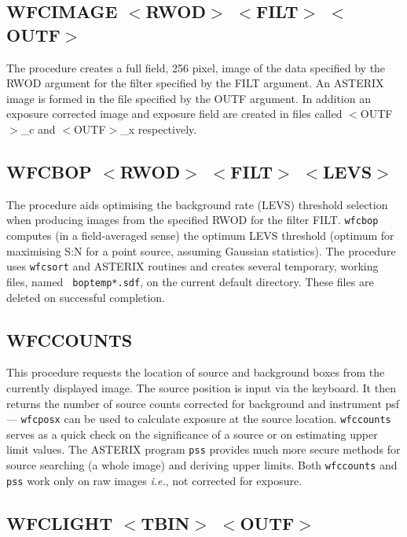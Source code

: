 \subsection{WFCIMAGE $<$RWOD$>$ $<$FILT$>$ $<$OUTF$>$}
\label{sec:procedures:wfcimage}

The procedure creates a full field, 256 pixel, image of the
data specified by the RWOD argument for the filter specified by the
FILT argument. An ASTERIX image is formed in the file specified
by the OUTF argument. In addition an exposure corrected image
and exposure field are created in files called $<$OUTF$>$\_c
and $<$OUTF$>$\_x respectively.

\subsection{WFCBOP $<$RWOD$>$ $<$FILT$>$ $<$LEVS$>$}
\label{sec:procedures:wfcbop}

The procedure aids optimising the background rate (LEVS) threshold
selection when producing images from the specified RWOD for the filter
FILT. {\tt wfcbop} computes (in a field-averaged sense) the optimum
LEVS threshold (optimum for maximising S:N for a point source, assuming
Gaussian statistics).  The procedure uses {\tt wfcsort} and ASTERIX
routines and creates several temporary, working files, named {\tt
boptemp*.sdf}, on the current default directory. These files are
deleted on successful completion.

\subsection{WFCCOUNTS}
\label{sec:procedures:wfccounts}

This procedure requests the location of source and background boxes from
the currently displayed image.  The source position is input via the
keyboard.  It then returns the number of source counts corrected for
background and instrument psf --- {\tt wfcposx} can be used to
calculate exposure at the source location.  {\tt wfccounts} serves as
a quick check on the significance of a source or on estimating upper
limit values. The ASTERIX program {\tt pss} provides much more secure
methods for source searching (a whole image) and deriving upper
limits.  Both {\tt wfccounts} and {\tt pss} work only on raw images
{\em i.e.}, not corrected for exposure.

\subsection{WFCLIGHT $<$TBIN$>$ $<$OUTF$>$}
\label{sec:procedures:wfclight}

